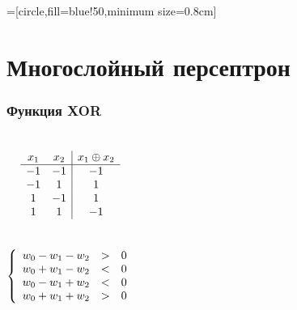 \documentclass[24pt,pdf,hyperref={unicode}]{beamer}
\begin{document}
=[circle,fill=blue!50,minimum size=0.8cm]



\section{Многослойный персептрон}

\begin{frame}\frametitle{Функция XOR}
\begin{columns}
$$
\begin{array}{c c | c}
x_1 & x_2 & x_1\oplus x_2 \\
\hline
-1 & -1 & -1 \\
-1 & 1 & 1 \\
1 & -1 & 1 \\
1 & 1 & -1 \\
\end{array}
$$\\[1cm]
$$
\left\{
\begin{array}{l l l l l l}
 w_0 - w_1 - w_2  & > & 0 \\
 w_0 + w_1 - w_2 & < & 0 \\
 w_0 - w_1 + w_2 & < & 0 \\
 w_0 + w_1 + w_2 & > & 0 \\
\end{array}
\right.
$$
\end{columns}
\end{frame}
\end{document}
